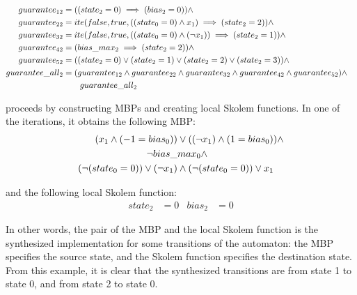 \begin{equation}
\begin{aligned}
  guarantee_{12}&=((state_2=0)\implies (bias_2=0)) \land\\
  guarantee_{22}&=ite(false, true, ((state_0=0)\land x_1)\implies (state_2=2)) \land\\
  guarantee_{32}&=ite(false, true, ((state_0=0)\land (\neg x_1))\implies (state_2=1)) \land\\
  guarantee_{42}&=(bias\_max_2\implies (state_2=2)) \land\\
  guarantee_{52}&=((state_2=0) \lor (state_2=1) \lor (state_2=2) \lor (state_2=3))\land \\
  guarantee\_all_2&=(guarantee_{12}\land guarantee_{22}\land guarantee_{32}\land guarantee_{42} \land guarantee_{52})\land \\
  &\qquad {} guarantee\_all_2&\notag
\end{aligned}
\end{equation}

\aeval proceeds by constructing MBPs and creating local Skolem functions. 
In one of the iterations, it obtains the following MBP:%
\begin{equation}
\begin{aligned}
  (x_1\land (-1=bias_0)) &\lor ((\neg x_1)\land (1=bias_0)) \land \\
  \neg bias\_&max_0 \land \\
  (\neg (state_0=0))\lor (\neg x_1) &\land
  (\neg (state_0=0))\lor x_1  \notag
\end{aligned}
\end{equation}

and the following local Skolem function:%
\begin{align*}
  state_2&=0 &
  bias_2&=0
\end{align*}

In other words, the pair of the MBP and the local Skolem function is the synthesized implementation for some transitions of the automaton: the MBP specifies the source state, and the Skolem function specifies the destination state.
From this example, it is clear that the synthesized transitions are from state 1 to state 0, and from state 2 to state 0.